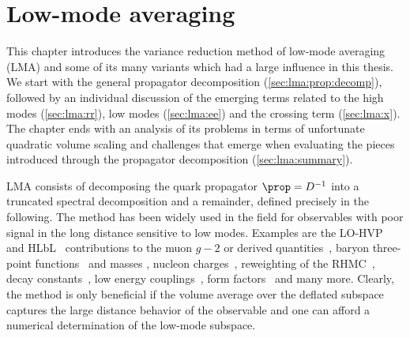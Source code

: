 \chapter{Low-mode averaging}
\label{ch:p2:lma}




This chapter introduces the variance reduction method of low-mode averaging~\cite{Neff_2001,DeGrand_2004,Giusti_2004} (LMA) and some of its many variants which had a large influence in this thesis.
We start with the general propagator decomposition (\cref{sec:lma:prop:decomp}), followed by an individual discussion of the emerging terms related to the high modes (\cref{sec:lma:rr}), low modes (\cref{sec:lma:ee}) and the crossing term (\cref{sec:lma:x}).
The chapter ends with an analysis of its problems in terms of unfortunate quadratic volume scaling and challenges that emerge when evaluating the pieces introduced through the propagator decomposition (\cref{sec:lma:summary}).


LMA consists of decomposing the quark propagator $\prop=D^{-1}$ into a truncated spectral decomposition and a remainder, defined precisely in the following.
The method has been widely used in the field for observables with poor signal in the long distance sensitive to low modes.
Examples are the LO-HVP~\cite{bmw_2024,Kuberski_2023,Aubin:2022hgm,Bazavov:2024eou,RBC_2024} and HLbL~\cite{Lin:2024khg} contributions to the muon $g-2$ or derived quantities~\cite{ExtendedTwistedMass:2025tpc}, baryon three-point functions~\cite{Yang:2015zja,Ohki:2012jyg} and masses \cite{Bali:2010se}, nucleon charges~\cite{Yamanaka:2018uud}, reweighting of the RHMC~\cite{Kuberski:2023zky}, decay constants~\cite{Bali:2014pva}, low energy couplings~\cite{Bernardoni:2011kd}, form factors~\cite{JLQCD:2009ofg} and many more.
Clearly, the method is only beneficial if the volume average over the deflated subspace captures the large distance behavior of the observable and one can afford a numerical determination of the low-mode subspace.

